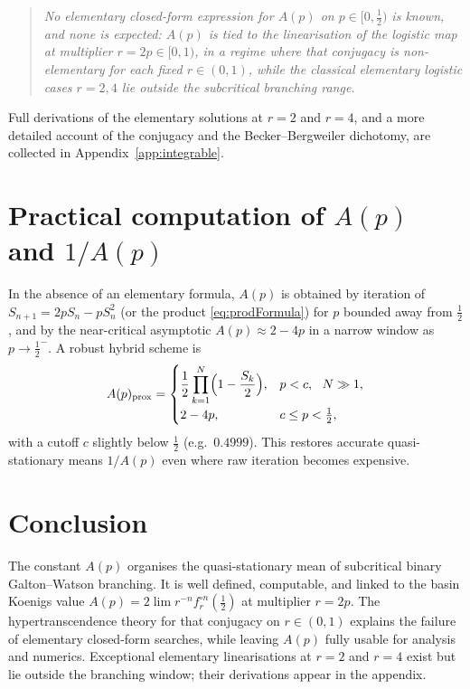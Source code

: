 \documentclass[11pt,a4paper]{article}
\theoremstyle{plain}
\theoremstyle{definition}
\begin{document}
\begin{quote}
\textit{No elementary closed-form expression for $A(p)$ on $p\in[0,\tfrac12)$ is known, and none is expected: $A(p)$ is tied to the linearisation of the logistic map at multiplier $r=2p\in[0,1)$, in a regime where that conjugacy is non-elementary for each fixed $r\in(0,1)$, while the classical elementary logistic cases $r=2,4$ lie outside the subcritical branching range.}
\end{quote}

Full derivations of the elementary solutions at $r=2$ and $r=4$, and a more detailed account of the conjugacy and the Becker--Bergweiler dichotomy, are collected in Appendix~\ref{app:integrable}.

\section{Practical computation of $A(p)$ and $1/A(p)$}
\label{sec:practical}

In the absence of an elementary formula, $A(p)$ is obtained by iteration of $S_{n+1}=2pS_n-pS_n^2$ (or the product \eqref{eq:prodFormula}) for $p$ bounded away from $\tfrac12$, and by the near-critical asymptotic $A(p)\approx 2-4p$ in a narrow window as $p\to\tfrac12^{-}$. A robust hybrid scheme is
\begin{equation*}
A(p)_{\mathrm{prox}}
=
\begin{cases}
\dfrac12\displaystyle\prod_{k=1}^{N}\Bigl(1-\dfrac{S_k}{2}\Bigr), & p<c,\ \ N\gg 1,\\[1em]
2-4p, & c\le p<\tfrac12,
\end{cases}
\end{equation*}
with a cutoff $c$ slightly below $\tfrac12$ (e.g.\ $0.4999$). This restores accurate quasi-stationary means $1/A(p)$ even where raw iteration becomes expensive.

\section{Conclusion}

The constant $A(p)$ organises the quasi-stationary mean of subcritical binary Galton--Watson branching. It is well defined, computable, and linked to the basin Koenigs value $A(p)=2\lim r^{-n}f_r^{\circ n}(\tfrac12)$ at multiplier $r=2p$. The hypertranscendence theory for that conjugacy on $r\in(0,1)$ explains the failure of elementary closed-form searches, while leaving $A(p)$ fully usable for analysis and numerics. Exceptional elementary linearisations at $r=2$ and $r=4$ exist but lie outside the branching window; their derivations appear in the appendix.
\end{document}
